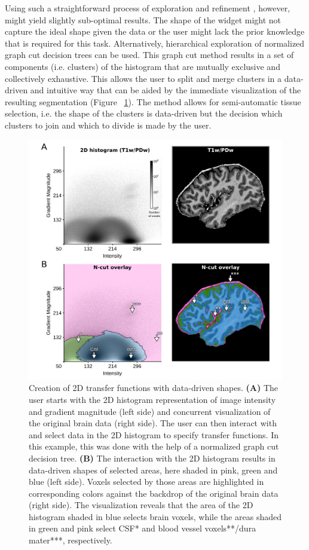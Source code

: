 Using such a straightforward process of exploration and refinement \parencite{Kniss2002}, however, might yield slightly sub-optimal results. The shape of the widget might not capture the ideal shape given the data or the user might lack the prior knowledge that is required for this task. Alternatively, hierarchical exploration of normalized graph cut decision trees \parencite{Ip2012} can be used. This graph cut method results in a set of components (i.e. clusters) of the histogram that are mutually exclusive and collectively exhaustive. This allows the user to split and merge clusters in a data-driven and intuitive way that can be aided by the immediate visualization of the resulting segmentation (Figure ~\ref{fig:Fig3}). The method allows for semi-automatic tissue selection, i.e. the shape of the clusters is data-driven but the decision which clusters to join and which to divide is made by the user.

\begin{figure}[htb!]
\centering
\includegraphics[width=\textwidth]{figures/chapter_02/figure_3.png}
\caption{Creation of 2D transfer functions with data-driven shapes. \textbf{(A)} The user starts with the 2D histogram representation of image intensity and gradient magnitude (left side) and concurrent visualization of the original brain data (right side). The user can then interact with and select data in the 2D histogram to specify transfer functions. In this example, this was done with the help of a normalized graph cut decision tree. \textbf{(B)} The interaction with the 2D histogram results in data-driven shapes of selected areas, here shaded in pink, green and blue (left side). Voxels selected by those areas are highlighted in corresponding colors against the backdrop of the original brain data (right side). The visualization reveals that the area of the 2D histogram shaded in blue selects brain voxels, while the areas shaded in green and pink select CSF* and blood vessel voxels**/dura mater***, respectively.}
\label{fig:Fig3}
\end{figure}

